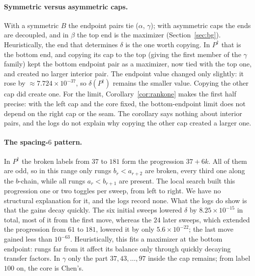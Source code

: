 \documentclass[11pt]{amsart}
\theoremstyle{definition}
\theoremstyle{remark}
\begin{document}
\paragraph{Symmetric versus asymmetric caps.} With a symmetric $B$ the endpoint pairs tie ($\alpha$, $\gamma$); with asymmetric caps the ends are decoupled, and in $\beta$ the top end is the maximizer (Section~\ref{sec:bg}). Heuristically, the end that determines $\delta$ is the one worth copying. In $P^\dagger$ that is the bottom end, and copying its cap to the top (giving the first member of the $\gamma$ family) kept the bottom endpoint pair as a maximizer, now tied with the top one, and created no larger interior pair. The endpoint value changed only slightly: it rose by $\approx7.724\times10^{-37}$, so $\delta(P^\dagger)$ remains the smaller value. Copying the other cap did create one. For the limit, Corollary~\ref{cor:rankone} makes the first half precise: with the left cap and the core fixed, the bottom-endpoint limit does not depend on the right cap or the seam. The corollary says nothing about interior pairs, and the logs do not explain why copying the other cap created a larger one.

\paragraph{The spacing-$6$ pattern.} In $P^\dagger$ the broken labels from $37$ to $181$ form the progression $37+6k$. All of them are odd, so in this range only rungs $b_r<a_{r+2}$ are broken, every third one along the $b$-chain, while all rungs $a_r<b_{r+1}$ are present. The local search built this progression one or two toggles per sweep, from left to right. We have no structural explanation for it, and the logs record none. What the logs do show is that the gains decay quickly. The six initial sweeps lowered $\delta$ by $8.25\times10^{-15}$ in total, most of it from the first move, whereas the $24$ later sweeps, which extended the progression from $61$ to $181$, lowered it by only $5.6\times10^{-22}$; the last move gained less than $10^{-63}$. Heuristically, this fits a maximizer at the bottom endpoint: rungs far from it affect its balance only through quickly decaying transfer factors. In $\gamma$ only the part $37,43,\dots,97$ inside the cap remains; from label $100$ on, the core is Chen's.



\end{document}
